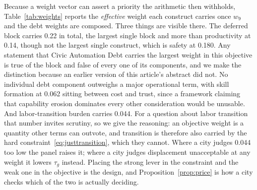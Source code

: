 	Because a weight vector can assert a priority the arithmetic then withholds, Table~\ref{tab:weights} reports the \textit{effective} weight each construct carries once $w_9$ and the debt weights are composed. Three things are visible there. The deferred block carries 0.22 in total, the largest single block and more than productivity at 0.14, though not the largest single construct, which is safety at 0.180. Any statement that Civic Automation Debt carries the largest weight in this objective is true of the block and false of every one of its components, and we make the distinction because an earlier version of this article's abstract did not. No individual debt component outweighs a major operational term, with skill formation at 0.062 sitting between cost and trust, since a framework claiming that capability erosion dominates every other consideration would be unusable. And labor-transition burden carries 0.044. For a question about labor transition that number invites scrutiny, so we give the reasoning: an objective weight is a quantity other terms can outvote, and transition is therefore also carried by the hard constraint~\eqref{eq:justtransition}, which they cannot. Where a city judges 0.044 too low the panel raises it; where a city judges displacement unacceptable at any weight it lowers $\tau_g$ instead. Placing the strong lever in the constraint and the weak one in the objective is the design, and Proposition~\ref{prop:price} is how a city checks which of the two is actually deciding.
	
